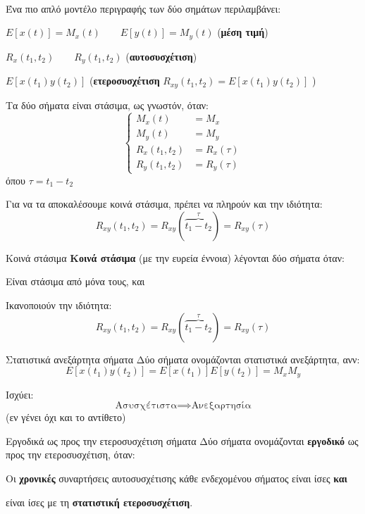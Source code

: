 \documentclass[11pt,a4paper,notitlepage,fleqn,final]{article}
\begin{document}
\paragraph{}
Ένα πιο απλό μοντέλο περιγραφής των δύο σημάτων περιλαμβάνει:
\begin{enumroman}
	\item \( E\left[x(t)\right] = M_x(t)
	\qquad E\left[ y(t) \right] = M_y(t)
	 \) (\textbf{μέση τιμή})
	\item \( R_x(t_1,t_2)\qquad R_y(t_1,t_2) \)
	(\textbf{αυτοσυσχέτιση})
	\item \( E\left[x(t_1)y(t_2)\right] \)
	(\textbf{ετεροσυσχέτιση} \( R_{xy}(t_1,t_2)=
	E\left[x(t_1)y(t_2)\right] \) )
\end{enumroman}

Τα δύο σήματα είναι στάσιμα, ως γνωστόν, όταν:
\[
\begin{cases}
M_x(t) &= M_x \\
M_y(t) &= M_y \\
R_x(t_1,t_2) &= R_x(\tau) \\
R_y(t_1,t_2) &= R_y(\tau)
\end{cases}
\]
όπου \( \tau = t_1-t_2 \)

Για να τα αποκαλέσουμε κοινά στάσιμα, πρέπει να πληρούν και την ιδιότητα:
\[
R_{xy}(t_1,t_2) = R_{xy}(\overbrace{t_1-t_2}^{\tau}) = R_{xy}(\tau)
\]

\begin{defn}{Κοινά στάσιμα}{}
	\textbf{Κοινά στάσιμα} (με την ευρεία έννοια) λέγονται δύο σήματα
	όταν:
	\begin{enumparen}
		\item Είναι στάσιμα από μόνα τους, και
		\item Ικανοποιούν την ιδιότητα:
		\[
		R_{xy}(t_1,t_2) = R_{xy}(\overbrace{t_1-t_2}^{\tau}) = R_{xy}(\tau)
		\]
	\end{enumparen}
\end{defn}

\begin{defn}{Στατιστικά ανεξάρτητα σήματα}{}
	Δύο σήματα ονομάζονται στατιστικά ανεξάρτητα, ανν:
	\[
	E\left[x(t_1)y(t_2)\right]
	= E\left[x(t_1)\right]E\left[y(t_2)\right]
	= M_xM_y
	\]
\end{defn}

Ισχύει:
\[
\text{Ασυσχέτιστα} \implies \text{Ανεξαρτησία}
\]
(εν γένει όχι και το αντίθετο)

\begin{defn}{Εργοδικά ως προς την ετεροσυσχέτιση σήματα}{}
	Δύο σήματα ονομάζονται \textbf{εργοδικό} ως προς την ετεροσυσχέτιση,
	όταν:
	\begin{enumparen}
		\item Οι \textbf{χρονικές} συναρτήσεις αυτοσυσχέτισης
		κάθε ενδεχομένου σήματος
		είναι ίσες \textbf{και}
		\item είναι ίσες με τη \textbf{στατιστική ετεροσυσχέτιση}.
	\end{enumparen}
\end{defn}
\end{document}
